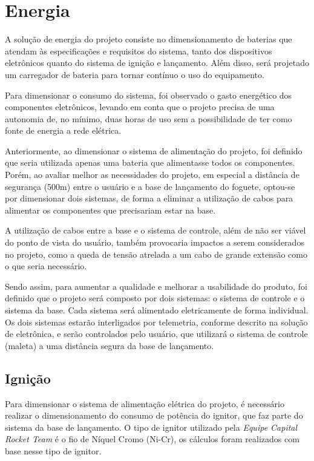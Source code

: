 \section{Energia}

A solução de energia do projeto consiste no dimensionamento de baterias que atendam às especificações e requisitos do sistema, tanto dos dispositivos eletrônicos quanto do sistema de ignição e lançamento. Além disso, será projetado um carregador de bateria para tornar contínuo o uso do equipamento.

Para dimensionar o consumo do sistema, foi observado o gasto energético dos componentes eletrônicos, levando em conta que o projeto precisa de uma autonomia de, no mínimo, duas horas de uso sem a possibilidade de ter como fonte de energia a rede elétrica.

Anteriormente, ao dimensionar o sistema de alimentação do projeto, foi definido que seria utilizada apenas uma bateria que alimentasse todos os componentes. Porém, ao avaliar melhor as necessidades do projeto, em especial a distância de segurança (500m) entre o usuário e a base de lançamento do foguete, optou-se por dimensionar dois sistemas, de forma a eliminar a utilização de cabos para alimentar os componentes que precisariam estar na base.

A utilização de cabos entre a base e o sistema de controle, além de não ser viável do ponto de vista do usuário, também provocaria impactos a serem considerados no projeto, como a queda de tensão atrelada a um cabo de grande extensão como o que seria necessário.

Sendo assim, para aumentar a qualidade e melhorar a usabilidade do produto, foi definido que o projeto será composto por dois sistemas: o sistema de controle e o sistema da base. Cada sistema será alimentado eletricamente de forma individual. Os dois sistemas estarão interligados por telemetria, conforme descrito na solução de eletrônica, e serão controlados pelo usuário, que utilizará o sistema de controle (maleta) a uma distância segura da base de lançamento.

\subsection{Ignição}
\label{sec:ignição}

Para dimensionar o sistema de alimentação elétrica do projeto, é necessário realizar o dimensionamento do consumo de potência do ignitor, que faz parte do sistema da base de lançamento. O tipo de ignitor utilizado pela \textit{{Equipe Capital Rocket Team}} é o fio de Níquel Cromo (Ni-Cr), os cálculos foram realizados com base nesse tipo de ignitor.

